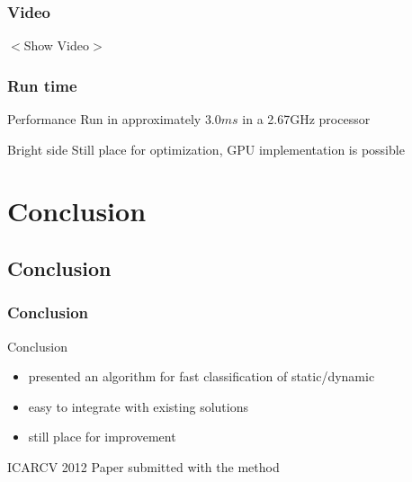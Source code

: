 \documentclass{beamer}
\begin{document}
	\begin{frame}
		\frametitle{Video}
		\centering
		$<$Show Video$>$
		
	\end{frame}		

	\begin{frame}
		\frametitle{Run time}

		\begin{exampleblock}{Performance}
			Run in approximately $3.0ms$ in a 2.67GHz processor
		\end{exampleblock}		
		
		\begin{exampleblock}{Bright side}
			Still place for optimization, GPU implementation is possible
		\end{exampleblock}				
		
	\end{frame}	

\section{Conclusion}

\subsection*{Conclusion}

	\begin{frame}
		\frametitle{Conclusion}
		
		\begin{block}{Conclusion}
			\begin{itemize}
			\item presented an algorithm for fast classification of static/dynamic
			\item easy to integrate with existing solutions
			\item still place for improvement
			\end{itemize}
		\end{block}		
		
		\begin{block}{ICARCV 2012}		
			Paper submitted with the method
		\end{block}

	\end{frame}
\end{document}

